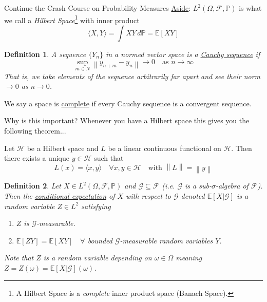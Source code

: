 \documentclass[12pt]{article}
\newenvironment{theorem}[2][Theorem:]{\begin{trivlist} %
\item[\hskip \labelsep {\bfseries #1}\hskip \labelsep {\bfseries #2.}]}{\end{trivlist}}
\newtheorem{definition}{Definition}
\newcommand\norm[1]{\left\lVert#1\right\rVert} %
\begin{document}
\begin{section}{Continue the Crash Course on Probability Measures}
\noindent \underline{Aside}: $L^2(\Omega,\mathcal F,\mathbb P)$ is what we call a {\em Hilbert Space}\footnote{A Hilbert Space is a {\em complete} inner product space (Banach Space)\footnotemark.} with inner product
\begin{equation*}
	\langle X,Y \rangle = \int XY\, d\mathbb P = \mathbb E[XY]
\end{equation*}

\begin{definition} A sequence $\{Y_n\}$ in a normed vector space is a \underline{Cauchy sequence} if 
\begin{equation*}
	\sup_{m \in N} \norm{y_{n+m} - y_n} \longrightarrow 0 \quad \text{as $n \longrightarrow \infty$}
\end{equation*}
That is, we take elements of the sequence arbitrarily far apart and see their norm $\longrightarrow 0$ as $n \longrightarrow 0$.
\end{definition}

\noindent We say a space is \underline{complete} if every Cauchy sequence is a convergent sequence.

\begin{theorem}{$L^p(\Omega, \mathcal F, \mathbb P)$ is a complete normed vector space}
\end{theorem}

\noindent Why is this important? Whenever you have a Hilbert space this gives you the following theorem...

\begin{theorem}{Riesz Representation Theorem} Let $\mathcal H$ be a Hilbert space and $L$ be a linear continuous functional on $\mathcal H$. Then there exists a unique $y \in \mathcal H$ such that
\begin{equation*}
	L(x) = \langle x,y\rangle \quad \forall x,y\in\mathcal H \quad \text{with } \norm{L} = \norm{y}
\end{equation*}
\end{theorem}

\begin{definition} \label{def:condexpect} Let $X \in L^2(\Omega, \mathcal F, \mathbb P)$ and $\mathcal G \subseteq \mathcal F$ (i.e. $\mathcal G$ is a sub-$\sigma$-algebra of $\mathcal F$). Then the \underline{conditional expectation} of $X$ with respect to $\mathcal G$ denoted $\mathbb E[X|\mathcal G]$ is a random variable $Z \in L^2$ satisfying
\begin{enumerate}
	\item $Z$ is $\mathcal G$-measurable. \label{gmeasurable}
	\item $\mathbb E[ZY] = \mathbb E[XY] \quad \forall$ bounded $\mathcal G$-measurable random variables $Y$. \label{ezy=exy}
\end{enumerate}
Note that $Z$ is a random variable depending on $\omega \in \Omega$ meaning $Z = Z(\omega) = \mathbb E[X|\mathcal G](\omega)$.
\end{definition}


\end{section}
\end{document}
